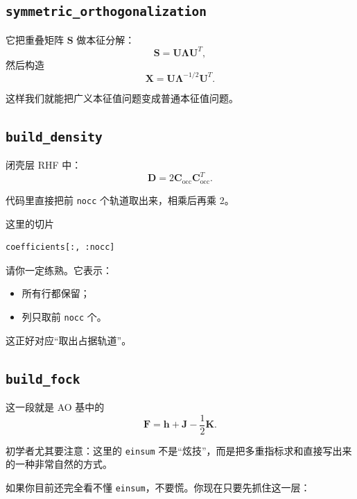 \documentclass[UTF8,11pt,fontset=fandol]{ctexbook}
\begin{document}
\subsection*{\texttt{symmetric\_orthogonalization}}

它把重叠矩阵 $\mathbf{S}$ 做本征分解：
\begin{equation}
\mathbf{S} = \mathbf{U}\bm{\Lambda}\mathbf{U}^T,
\end{equation}
然后构造
\begin{equation}
\mathbf{X}=\mathbf{U}\bm{\Lambda}^{-1/2}\mathbf{U}^T.
\end{equation}

这样我们就能把广义本征值问题变成普通本征值问题。

\subsection*{\texttt{build\_density}}

闭壳层 RHF 中：
\begin{equation}
\mathbf{D}=2\mathbf{C}_{\mathrm{occ}}\mathbf{C}_{\mathrm{occ}}^T.
\end{equation}

代码里直接把前 \texttt{nocc} 个轨道取出来，相乘后再乘 2。

这里的切片
\begin{lstlisting}[style=pythonstyle]
coefficients[:, :nocc]
\end{lstlisting}
请你一定练熟。它表示：
\begin{itemize}
  \item 所有行都保留；
  \item 列只取前 \texttt{nocc} 个。
\end{itemize}

这正好对应“取出占据轨道”。

\subsection*{\texttt{build\_fock}}

这一段就是 AO 基中的
\begin{equation}
\mathbf{F}=\mathbf{h}+\mathbf{J}-\frac{1}{2}\mathbf{K}.
\end{equation}

初学者尤其要注意：这里的 \texttt{einsum} 不是“炫技”，而是把多重指标求和直接写出来的一种非常自然的方式。

如果你目前还完全看不懂 \texttt{einsum}，不要慌。你现在只要先抓住这一层：
\end{document}

